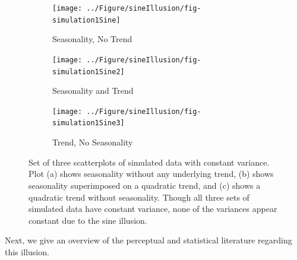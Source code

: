 \documentclass[11pt]{isuthesis}\usepackage[]{graphicx}\usepackage[]{color}
\newenvironment{knitrout}{}{} %
\begin{document}
\begin{figure}[h!tbp]\centering
\begin{subfigure}[b]{.31\textwidth}
  \centering
\begin{knitrout}
\color{fgcolor}

{\centering \texttt{[image: ../Figure/sineIllusion/fig-simulation1Sine]} 

}



\end{knitrout}
  \caption{\small Seasonality, No Trend}
  \label{simulation1}
\end{subfigure}
\begin{subfigure}[b]{.31\textwidth}\centering
\begin{knitrout}
\color{fgcolor}

{\centering \texttt{[image: ../Figure/sineIllusion/fig-simulation1Sine2]} 

}



\end{knitrout}
  \caption{\small Seasonality and Trend}
  \label{simulation2}
\end{subfigure}
\begin{subfigure}[b]{.31\textwidth}\centering
\begin{knitrout}
\color{fgcolor}

{\centering \texttt{[image: ../Figure/sineIllusion/fig-simulation1Sine3]} 

}



\end{knitrout}
  \caption{\small Trend, No Seasonality}
  \label{simulation3}
\end{subfigure}
\caption[Trend, seasonality, and the sine illusion]{Set of three scatterplots of simulated data with constant variance. Plot (a) shows seasonality without any underlying trend, (b) shows seasonality superimposed on a quadratic trend, and (c) shows a quadratic trend without seasonality. Though all three sets of simulated data have constant variance, none of the variances appear constant due to the sine illusion.}\label{fig:twoillusions-simulation}
\end{figure}

Next, we give an overview of the perceptual and statistical literature regarding this illusion.
\end{document}
